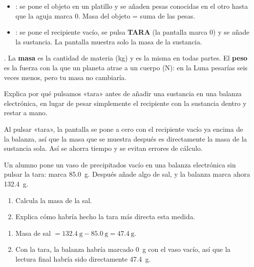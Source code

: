\begin{itemize}
    \item {}: se pone el objeto en un platillo y se añaden pesas conocidas en el otro hasta que la aguja marca 0. Masa del objeto = suma de las pesas.
    \item {}: se pone el recipiente vacío, se pulsa \textbf{TARA} (la pantalla marca 0) y se añade la sustancia. La pantalla muestra solo la masa de la sustancia.
\end{itemize}

\begin{impt}
    . La \textbf{masa} es la cantidad de materia (\unit{\kg}) y es la misma en todas partes. El \textbf{peso} es la fuerza con la que un planeta atrae a un cuerpo (\unit{\N}): en la Luna pesarías seis veces menos, pero tu masa no cambiaría.
\end{impt}

\begin{exercise}
    Explica por qué pulsamos «tara» antes de añadir una sustancia en una balanza electrónica, en lugar de pesar simplemente el recipiente con la sustancia dentro y restar a mano.
    \begin{solu}
        Al pulsar «tara», la pantalla se pone a cero con el recipiente vacío ya encima de la balanza, así que la masa que se muestra después es directamente la masa de la sustancia sola. Así se ahorra tiempo y se evitan errores de cálculo.
    \end{solu}
\end{exercise}

\begin{exercise}
    Un alumno pone un vaso de precipitados vacío en una balanza electrónica sin pulsar la tara: marca \qty{85.0}{\g}. Después añade algo de sal, y la balanza marca ahora \qty{132.4}{\g}.
    \begin{enumerate}[label=\letraminuscula]
        \item Calcula la masa de la sal.
        \item Explica cómo habría hecho la tara más directa esta medida.
    \end{enumerate}
    \begin{solu}
        \begin{enumerate}[label=\alph*)]
            \item Masa de sal \(= \qty{132.4}{\g} - \qty{85.0}{\g} = \qty{47.4}{\g}\).
            \item Con la tara, la balanza habría marcado \qty{0}{\g} con el vaso vacío, así que la lectura final habría sido directamente \qty{47.4}{\g}.
        \end{enumerate}
    \end{solu}
\end{exercise}


